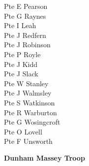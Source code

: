 \begin{multicols}{2}
  Pte E Pearson \\
  Pte G Raynes \\
  Pte I Leah \\
  Pte J Redfern \\
  Pte J Robinson \\
  Pte P Royle \\
  Pte J Kidd \\
  Pte J Slack \\
  Pte W Stanley \\
  Pte J Walmsley \\
  Pte S Watkinson \\
  Pte R Warburton \\
  Pte G Wosingcroft \\
  Pte O Lovell \\
  Pte F Unsworth \\
\end{multicols}

\begin{center}
  \Large
  \textbf{Dunham Massey Troop}
\end{center}

